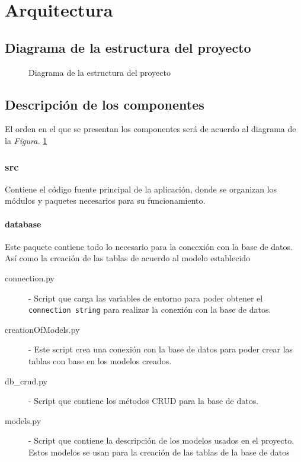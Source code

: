\section{Arquitectura}

\subsection{Diagrama de la estructura del proyecto}

\begin{figure}[h]


    \caption{Diagrama de la estructura del proyecto}
    \label{project_struct}
\end{figure}

\subsection{Descripci\'on de los componentes}

\noindent El orden en el que se presentan los componentes será de acuerdo al diagrama de la \textit{Figura.} \ref{project_struct}

\subsubsection*{src}
\noindent Contiene el código fuente principal de la aplicación, donde se organizan los módulos y paquetes necesarios para su funcionamiento.

\paragraph{database}
\noindent Este paquete contiene todo lo necesario para la concexión con la base de datos. Así como la creación de las tablas de acuerdo al modelo establecido
\begin{description}
    \item[connection.py] - Script que carga las variables de entorno para poder obtener el \texttt{connection string} para realizar la conexión con la base de datos.
    
    \item[creationOfModels.py] - Este script crea una conexión con la base de datos para poder crear las tablas con base en los modelos creados.
    
    \item[db\_crud.py] - Script que contiene los métodos CRUD para la base de datos.
    
    \item[models.py] - Script que contiene la descripción de los modelos usados en el proyecto. Estos modelos se usan para la creación de las tablas de la base de datos
\end{description}


